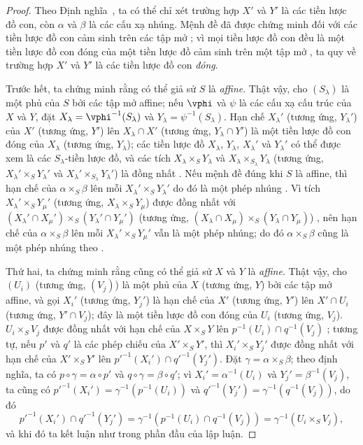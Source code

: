 \documentclass[oneside]{amsart}
\newcommand{\oldpage}[2][]{{\marginnote{\normalfont\textbf{#1}~|~#2}}\ignorespaces}
\begin{document}
\begin{proof}
Theo Định nghĩa~, ta có thể chỉ xét trường hợp $X'$ và $Y'$ là các tiền lược đồ con, còn $\alpha$ và $\beta$ là các cấu xạ nhúng.
Mệnh đề đã được chứng minh đối với các tiền lược đồ con cảm sinh trên các tập mở ;
vì mọi tiền lược đồ con đều là một tiền lược đồ con đóng của một tiền lược đồ cảm sinh trên một tập mở , ta quy về trường hợp $X'$ và $Y'$ là các tiền lược đồ con \emph{đóng}.

Trước hết, ta chứng minh rằng có thể giả sử $S$ là \emph{affine}.
Thật vậy, cho $(S_\lambda)$ là một phủ của $S$ bởi các tập mở affine;
nếu $\vphi$ và $\psi$ là các cấu xạ cấu trúc của $X$ và $Y$, đặt $X_\lambda=\vphi^{-1}(S_\lambda)$ và $Y_\lambda=\psi^{-1}(S_\lambda)$.
Hạn chế $X_\lambda'$ (tương ứng, $Y_\lambda'$) của $X'$ (tương ứng, $Y'$) lên $X_\lambda\cap X'$ (tương ứng, $Y_\lambda\cap Y'$) là một tiền lược đồ con đóng của $X_\lambda$ (tương ứng, $Y_\lambda$); các tiền lược đồ $X_\lambda$, $Y_\lambda$, $X_\lambda'$ và $Y_\lambda'$ có thể được xem là các $S_\lambda$-tiền lược đồ, và các tích $X_\lambda\times_S Y_\lambda$ và $X_\lambda\times_{S_\lambda}Y_\lambda$ (tương ứng, $X_\lambda'\times_S Y_\lambda'$ và $X_\lambda'\times_{S_\lambda}Y_\lambda'$) là đồng nhất .
Nếu mệnh đề đúng khi $S$ là affine, thì hạn chế của $\alpha\times_S\beta$ lên mỗi $X_\lambda'\times_S Y_\lambda'$ do đó là một phép nhúng .
Vì tích $X_\lambda'\times_S Y_\mu'$ (tương ứng, $X_\lambda\times_S Y_\mu$) được đồng nhất với $(X_\lambda'\cap X_\mu')\times_S(Y_\lambda'\cap Y_\mu')$ (tương ứng, $(X_\lambda\cap X_\mu)\times_S(Y_\lambda\cap Y_\mu)$) , nên hạn chế của $\alpha\times_S\beta$
\oldpage[I]{125}
lên mỗi $X_\lambda'\times_S Y_\mu'$ vẫn là một phép nhúng;
do đó $\alpha\times_S\beta$ cũng là một phép nhúng theo .

Thứ hai, ta chứng minh rằng cũng có thể giả sử $X$ và $Y$ là \emph{affine}.
Thật vậy, cho $(U_i)$ (tương ứng, $(V_j)$) là một phủ của $X$ (tương ứng, $Y$) bởi các tập mở affine, và gọi $X_i'$ (tương ứng, $Y_j'$) là hạn chế của $X'$ (tương ứng, $Y'$) lên $X'\cap U_i$ (tương ứng, $Y'\cap V_j$); đây là một tiền lược đồ con đóng của $U_i$ (tương ứng, $V_j$).
$U_i\times_S V_j$ được đồng nhất với hạn chế của $X\times_S Y$ lên $p^{-1}(U_i)\cap q^{-1}(V_j)$ ;
tương tự, nếu $p'$ và $q'$ là các phép chiếu của $X'\times_S Y'$, thì $X_i'\times_S Y_j'$ được đồng nhất với hạn chế của $X'\times_S Y'$ lên ${p'}^{-1}(X_i')\cap{q'}^{-1}(Y_j')$.
Đặt $\gamma=\alpha\times_S\beta$;
theo định nghĩa, ta có $p\circ\gamma=\alpha\circ p'$ và $q\circ\gamma=\beta\circ q'$;
vì $X_i'=\alpha^{-1}(U_i)$ và $Y_j'=\beta^{-1}(V_j)$, ta cũng có ${p'}^{-1}(X_i')=\gamma^{-1}(p^{-1}(U_i))$ và ${q'}^{-1}(Y_j')=\gamma^{-1}(q^{-1}(V_j))$, do đó
\[
  {p'}^{-1}(X_i')\cap{q'}^{-1}(Y_j')=\gamma^{-1}(p^{-1}(U_i)\cap q^{-1}(V_j))=\gamma^{-1}(U_i\times_S V_j),
\]
và khi đó ta kết luận như trong phần đầu của lập luận.


\end{proof}
\end{document}
